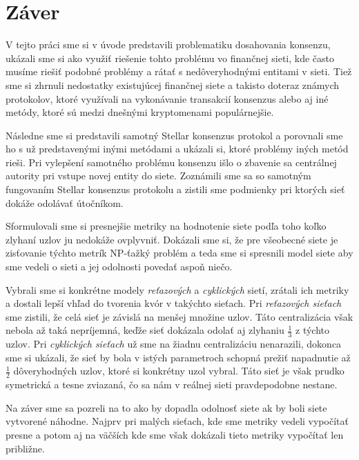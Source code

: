 \chapter*{Záver}  %

V tejto práci sme si v úvode predstavili problematiku dosahovania konsenzu,
ukázali sme si ako využiť riešenie tohto problému vo finančnej sieti, kde
často musíme riešiť podobné problémy a rátať s nedôveryhodnými entitami v sieti.
Tiež sme si zhrnuli nedostatky existujúcej finančnej siete a takisto doteraz
známych protokolov, ktoré využívali na vykonávanie transakcií konsenzus
alebo aj iné metódy, ktoré sú medzi dnešnými kryptomenami populárnejšie.

Následne sme si predstavili samotný Stellar konsenzus protokol a porovnali sme
ho s už predstavenými inými metódami a ukázali si, ktoré problémy iných metód
rieši. Pri vylepšení samotného problému konsenzu išlo o zbavenie sa centrálnej
autority pri vstupe novej entity do siete.
Zoznámili sme sa so samotným fungovaním Stellar konsenzus protokolu a zistili
sme podmienky pri ktorých sieť dokáže odolávať útočníkom.

Sformulovali sme si presnejšie metriky na hodnotenie siete podľa toho koľko
zlyhaní uzlov ju nedokáže ovplyvniť. Dokázali sme si, že pre všeobecné siete
je zisťovanie týchto metrík NP-ťažký problém a teda sme si spresnili model
siete aby sme vedeli o sieti a jej odolnosti povedať aspoň niečo.

Vybrali sme si konkrétne modely \textit{reťazových} a \textit{cyklických} sietí,
zrátali ich metriky a dostali lepší vhľad do tvorenia kvór v takýchto sieťach.
Pri \textit{reťazových sieťach} sme zistili, že celá sieť je závislá na menšej
množine uzlov. Táto centralizácia však nebola až taká nepríjemná, keďže sieť
dokázala odolať aj zlyhaniu $\frac{1}{3}$ z týchto uzlov.
Pri \textit{cyklických sieťach} už sme na žiadnu centralizáciu nenarazili,
dokonca sme si ukázali, že sieť by bola v istých parametroch schopná prežiť
napadnutie až $\frac{1}{2}$ dôveryhodných uzlov, ktoré si konkrétny uzol vybral.
Táto sieť je však prudko symetrická a tesne zviazaná, čo sa nám v reálnej
sieti pravdepodobne nestane.

Na záver sme sa pozreli na to ako by dopadla odolnosť siete ak by boli siete
vytvorené náhodne. Najprv pri malých sieťach, kde sme metriky vedeli vypočítať
presne a potom aj na väčších kde sme však dokázali tieto metriky vypočítať
len približne.

